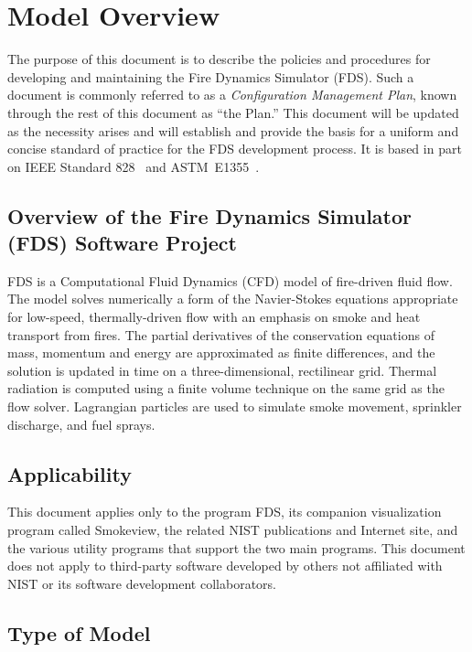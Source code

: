 \documentclass[11pt]{book}
\begin{document}
\tableofcontents

\mainmatter


\chapter{Model Overview}


The purpose of this document is to describe the policies and procedures for developing and maintaining the Fire Dynamics
Simulator (FDS). Such a document is commonly referred to as a {\em Configuration Management Plan}, known through the rest of this document as ``the Plan.'' This document
will be updated as the necessity arises and will establish and provide the basis for a uniform and concise standard of practice for the FDS
development process. It is based in part on IEEE Standard 828~\cite{IEEE-828} and ASTM~E1355~\cite{ASTM:E1355}.


\section{Overview of the Fire Dynamics Simulator (FDS) Software Project}

FDS is a Computational Fluid Dynamics (CFD) model of fire-driven fluid flow. The model solves numerically a form of the Navier-Stokes equations
appropriate for low-speed, thermally-driven flow with an emphasis on smoke and heat transport from fires. The partial derivatives of the conservation
equations of mass, momentum and energy are approximated as finite differences, and the solution is updated in time on a three-dimensional,
rectilinear grid. Thermal radiation is computed using a finite volume technique on the same grid as the flow solver. Lagrangian particles are used to
simulate smoke movement, sprinkler discharge, and fuel sprays.

\section{Applicability}

This document applies only to the program FDS, its companion visualization program called Smokeview,  the related NIST publications and Internet
site, and the various utility programs that support the two main programs. This document does not apply to third-party software developed by others
not affiliated with NIST or its software development collaborators.


\section{Type of Model}
\end{document}
